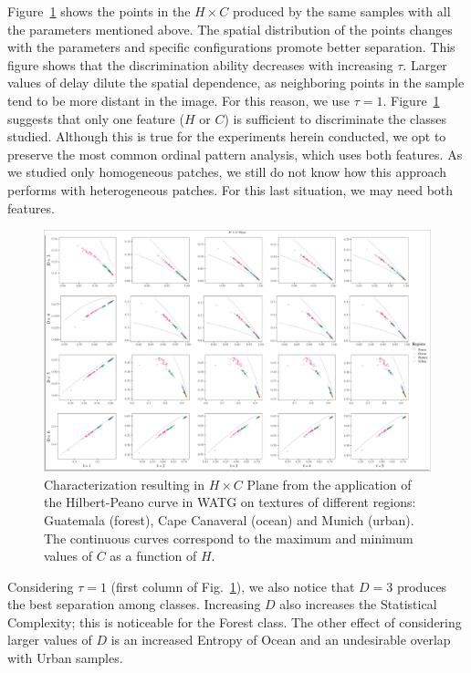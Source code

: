 \documentclass[journal]{IEEEtran}
\begin{document}
Figure~\ref{fig:Regions} shows the points in the $H\times C$ produced by the same samples with all the parameters mentioned above.
The spatial distribution of the points changes with the parameters and specific configurations promote better separation.
This figure shows that the discrimination ability decreases with increasing $\tau$.
Larger values of delay dilute the spatial dependence, as neighboring points in the sample tend to be more distant in the image.
For this reason, we use $\tau=1$. Figure~\ref{fig:Regions} suggests that only one feature ($H$ or $C$) is sufficient to discriminate the classes studied. Although this is true for the experiments herein conducted, we opt to preserve the most common ordinal pattern analysis, which uses both features. As we studied only homogeneous patches, we still do not know how this approach performs with heterogeneous patches. %
For this last situation, we may need both features.

\begin{figure}
	\centering
	\includegraphics[width=1\textwidth]{Figures/WATGHC.pdf}
	\caption{Characterization resulting in $H \times C$ Plane from the application of the Hilbert-Peano curve in WATG on textures of different regions: Guatemala (forest), Cape Canaveral (ocean) and Munich (urban). 
	The continuous curves correspond to the maximum and minimum values of $C$ as a function of $H$.}
	\label{fig:Regions}
\end{figure}

Considering $\tau=1$ (first column of Fig.~\ref{fig:Regions}), 
we also notice that $D=3$ produces the best separation among classes.
Increasing $D$ also increases the Statistical Complexity; this is noticeable for the Forest class.
The other effect of considering larger values of $ D $ is an increased Entropy of Ocean and an undesirable overlap with Urban samples.
\end{document}
